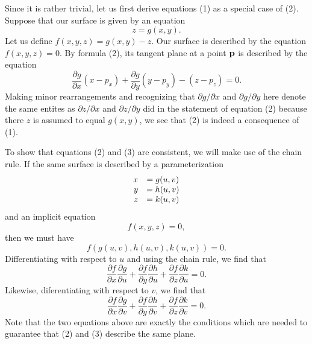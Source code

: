 \documentclass[12pt]{article}
\begin{document}
Since it is rather trivial, let us first derive equations (1) as a special case of (2).  Suppose that our surface is given by an equation 
 $$z = g(x, y).$$
Let us define $f(x,y,z) = g(x, y) - z.$  Our surface is described by the equation $f(x, y, z) = 0.$   By formula (2), its tangent plane at a point ${\bf p}$ is described by the equation
 $$\frac{\partial g}{\partial x} (x - p_x) + \frac{\partial g}{\partial y} (y - p_y) - (z - p_z) = 0.$$
Making minor rearrangements and recognizing that $\partial g / \partial x$ and  $\partial g / \partial y$ here denote the same entites as $\partial z / \partial x$ and  $\partial z / \partial y$ did in the statement of equation (2) because there $z$ is assumed to equal $g(x, y)$, we see that (2) is indeed a consequence of (1).

To show that equations (2) and (3) are consistent, we will make use of the chain rule.  If the same surface is described by a parameterization
 $$\begin{matrix} \hfill x &= g(u,v) \\ \hfill y &= h(u,v) \\ \hfill z &= k(u,v) \end{matrix}$$
and an implicit equation
 $$f(x,y,z) = 0,$$
then we must have
 $$f (g(u,v), h(u,v), k(u,v)) = 0.$$
Differentiating with respect to $u$ and using the chain rule, we find that
 $$\frac{\partial f}{\partial x} \frac{\partial g}{\partial u} + \frac{\partial f}{\partial y} \frac{\partial h}{\partial u} + \frac{\partial f}{\partial z} \frac{\partial k}{\partial u} = 0.$$
Likewise, diferentiating with respect to $v$, we find that
 $$\frac{\partial f}{\partial x} \frac{\partial g}{\partial v} + \frac{\partial f}{\partial y} \frac{\partial h}{\partial v} + \frac{\partial f}{\partial z} \frac{\partial k}{\partial v} = 0.$$
Note that the two equations above are exactly the conditions which are needed to  guarantee that (2) and (3) describe the same plane.
\end{document}
